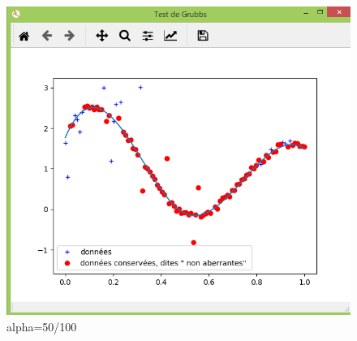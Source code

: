 \documentclass[11pt]{report}
\begin{document}
\begin{figure}[!htb]
\endminipage
{}%
\includegraphics[width=\linewidth]{gru50.PNG}  
\caption{alpha=50/100}
\label{alpha_2995}
\endminipage



\end{figure}
\end{document}
